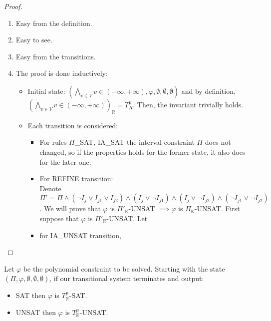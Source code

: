\begin{proof}
\begin{enumerate}
\item Easy from the definition.
\item Easy to see.
\item Easy from the transitions.
\item The proof is done inductively:
\begin{itemize}
\item \sloppy Initial state: $(\bigwedge\limits_{v \in V}v \in (-\infty, +\infty), \varphi, \emptyset, \emptyset, \emptyset)$ and by definition, ${(\bigwedge\limits_{v \in V}v \in (-\infty, +\infty))_\mathbb{R} = T^p_R}$. Then, the invariant trivially holds.
\item Each transition is considered:
\begin{itemize}
\item For rules $\Pi$\_SAT, IA\_SAT the interval constraint $\Pi$ does not changed, so if the properties holds for the former state, it also does for the later one.
\item \sloppy For REFINE transition: \\ Denote ${\Pi' = \Pi \wedge (\neg I_j \vee I_{j1} \vee I_{j2}) \wedge (I_j \vee \neg I_{j1}) \wedge (I_j \vee \neg I_{j2}) \wedge (\neg I_{j1} \vee \neg I_{j2})}$. We will prove that $\varphi$ is $\Pi'_\mathbb{R}$-UNSAT $\implies \varphi$ is $\Pi_\mathbb{R}$-UNSAT. First suppose that $\varphi$ is $\Pi'_\mathbb{R}$-UNSAT. Let
\item for IA\_UNSAT transition, 
\end{itemize}
\end{itemize}
\end{enumerate}
\end{proof}

\begin{theorem}
Let $\varphi$ be the polynomial constraint to be solved. Starting with the state $(\Pi, \varphi, \emptyset, \emptyset, \emptyset)$, if our transitional system terminates and output:
\begin{itemize}
\item SAT then $\varphi$ is $T^p_\mathbb{R}$-SAT.
\item UNSAT then $\varphi$ is $T^p_\mathbb{R}$-UNSAT.
\end{itemize}
\end{theorem}

